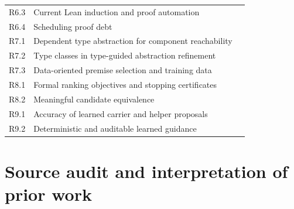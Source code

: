 \documentclass[11pt,a4paper]{article}
\theoremstyle{remark}
\begin{document}
\begin{longtable}{@{}L{15mm}L{121mm}r@{}}
R6.3 & Current Lean induction and proof automation & \pageref{q:R6.3}\\
R6.4 & Scheduling proof debt & \pageref{q:R6.4}\\
R7.1 & Dependent type abstraction for component reachability & \pageref{q:R7.1}\\
R7.2 & Type classes in type-guided abstraction refinement & \pageref{q:R7.2}\\
R7.3 & Data-oriented premise selection and training data & \pageref{q:R7.3}\\
R8.1 & Formal ranking objectives and stopping certificates & \pageref{q:R8.1}\\
R8.2 & Meaningful candidate equivalence & \pageref{q:R8.2}\\
R9.1 & Accuracy of learned carrier and helper proposals & \pageref{q:R9.1}\\
R9.2 & Deterministic and auditable learned guidance & \pageref{q:R9.2}\\
\bottomrule
\end{longtable}

\clearpage
\section{Source audit and interpretation of prior work}
\end{document}
